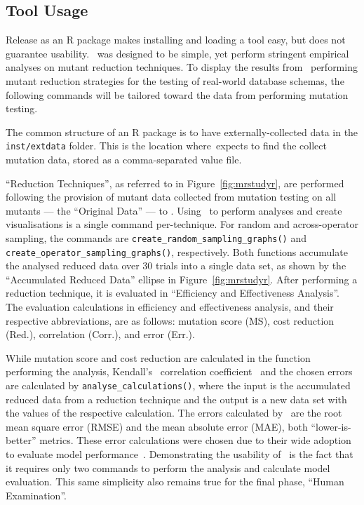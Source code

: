 \subsection{Tool Usage}



Release as an R package makes installing and loading a tool easy, but does not guarantee usability.
\mr~was designed to be simple, yet perform stringent empirical analyses on mutant reduction techniques.
To display the results from \mr~performing mutant reduction strategies for the testing of real-world
database schemas, the following commands will be tailored toward the data from performing mutation
testing.

The common structure of an R package is to have externally-collected data in the \texttt{inst/extdata}
folder. This is the location where~\mr expects to find the collect mutation data, stored as a
comma-separated value file.

``Reduction Techniques'', as referred to in Figure~\ref{fig:mrstudyr}, are performed following the
provision of mutant data collected from mutation testing on all mutants --- the ``Original Data'' ---
to \mr. Using \mr~to perform analyses and create visualisations is a single command per-technique.
For random and across-operator sampling, the commands are {\texttt{create\_random\_sampling\_graphs()}}
and {\texttt{create\_operator\_sampling\_graphs()}}, respectively. Both functions accumulate the analysed
reduced data over 30 trials into a single data set, as shown by the ``Accumulated Reduced Data'' ellipse
in Figure~\ref{fig:mrstudyr}. After performing a reduction technique, it is evaluated in ``Efficiency and
Effectiveness Analysis''. The evaluation calculations in efficiency and effectiveness analysis, and their
respective abbreviations, are as follows: mutation score (MS), cost reduction (Red.), correlation (Corr.),
and error (Err.).


While mutation score and cost reduction are calculated in the function performing the analysis, Kendall's
\taub~correlation coefficient~\cite{mcminn2016virtual} and the chosen errors are calculated by
\texttt{analyse\_calculations()}, where the input is the accumulated reduced data from a reduction technique
and the output is a new data set with the values of the respective calculation.  The errors calculated by
\mr~are the root mean square error (RMSE) and the mean absolute error (MAE), both ``lower-is-better'' metrics.
These error calculations were chosen due to their wide adoption to evaluate model performance~\cite{chai2014root}.
Demonstrating the usability of \mr~is the fact that it requires only two commands to perform the analysis and
calculate model evaluation. This same simplicity also remains true for the final phase, ``Human Examination''.

